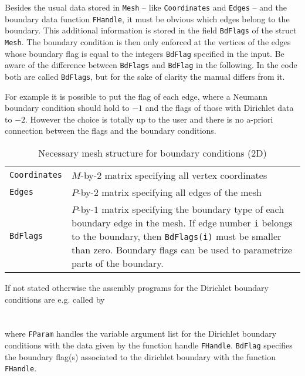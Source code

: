  Besides the usual data stored in {\tt Mesh} -- like {\tt Coordinates} and {\tt Edges} -- and the boundary data function {\tt FHandle}, it must be obvious which edges belong to the boundary. This additional information is stored in the field {\tt BdFlags} of the struct {\tt Mesh}. The boundary condition is then only enforced at the vertices of the edges whose boundary flag is equal to the integers {\tt BdFlag} specified in the input. Be aware of the difference between {\tt BdFlags} and {\tt BdFlag} in the following. In the \MATLAB code both are called {\tt BdFlags}, but for the sake of clarity the manual differs from it.

For example it is possible to put the flag of each edge, where a Neumann boundary condition should hold to $-1$ and the flags of those with Dirichlet data to $-2$. However the choice is totally up to the user and there is no a-priori connection between the flags and the boundary conditions.

\begin{table}[htb]
  \begin{tabular}{p{2cm}p{9cm}}
	{\tt Coordinates} & {\small $M$-by-$2$ matrix specifying all vertex coordinates} \\
    	{\tt Edges} & {\small $P$-by-$2$ matrix specifying all edges of the mesh} \\
	{\tt BdFlags} & {\small $P$-by-$1$ matrix specifying the boundary type of each boundary edge in the mesh. If edge number {\tt i} belongs to the boundary, then {\tt BdFlags(i)} must be smaller than zero. Boundary flags can be used to parametrize parts of the boundary.}
  \end{tabular}
  \caption{Necessary mesh structure for boundary conditions (2D)}
  \label{tab:bound_mesh}
\end{table}

 If not stated otherwise the assembly programs for the Dirichlet boundary conditions are e.g. called by \\

 \\
 \\

\noindent where {\tt FParam} handles the variable argument list for the Dirichlet boundary conditions with the data given by the function handle {\tt FHandle}. {\tt BdFlag} specifies the boundary flag(s) associated to the dirichlet boundary with the function {\tt FHandle}.\\

